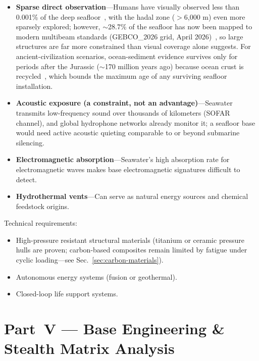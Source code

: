 \documentclass[aps,prd,twocolumn,superscriptaddress,nofootinbib]{revtex4-2}
\begin{document}
\begin{itemize}
  \item \textbf{Sparse direct observation}---Humans have visually observed less than 0.001\% of the deep seafloor~\cite{Bell2025}, with the hadal zone ($>$6,000 m) even more sparsely explored; however, ${\sim}$28.7\% of the seafloor has now been mapped to modern multibeam standards (GEBCO\_2026 grid, April 2026)~\cite{Seabed2030,GEBCO2026}, so large structures are far more constrained than visual coverage alone suggests. For ancient-civilization scenarios, ocean-sediment evidence survives only for periods after the Jurassic (${\sim}$170 million years ago) because ocean crust is recycled~\cite{Schmidt2019}, which bounds the maximum age of any surviving seafloor installation.
  \item \textbf{Acoustic exposure (a constraint, not an advantage)}---Seawater transmits low-frequency sound over thousands of kilometers (SOFAR channel), and global hydrophone networks already monitor it; a seafloor base would need active acoustic quieting comparable to or beyond submarine silencing.
  \item \textbf{Electromagnetic absorption}---Seawater's high absorption rate for electromagnetic waves makes base electromagnetic signatures difficult to detect.
  \item \textbf{Hydrothermal vents}---Can serve as natural energy sources and chemical feedstock origins.
\end{itemize}

Technical requirements:

\begin{itemize}
  \item High-pressure resistant structural materials (titanium or ceramic pressure hulls are proven; carbon-based composites remain limited by fatigue under cyclic loading---see Sec.~\ref{sec:carbon-materials}).
  \item Autonomous energy systems (fusion or geothermal).
  \item Closed-loop life support systems.
\end{itemize}


\section{Part~V --- Base Engineering \& Stealth Matrix Analysis}\label{sec:part5}
\end{document}

